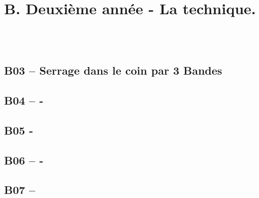 \subsection{\texorpdfstring{\\
}{ }}\label{section}

\section{}\label{section-1}

\section{B. Deuxième année - La
technique.}\label{b.-deuxiuxe8me-annuxe9e---la-technique.}

\subsection{}\label{section-2}

\subsection{\texorpdfstring{\\
}{ }}\label{section-3}





\subsection{B03 -- Serrage dans le coin par 3
Bandes}\label{b03-serrage-dans-le-coin-par-3-bandes}


\subsection{B04 --  -
}\label{b04-3-billes-dans-le-coin-par-le-tour--}



\subsection{B05 - }\label{b05---3-bandes-dans-le-carruxe9}


\subsection{B06 --  -
}\label{b06-rappel-dans-le-coin-par-une-bande--}


\subsection{B07 --
}\label{b07-rappels-extruxeames-par-une-bande}



